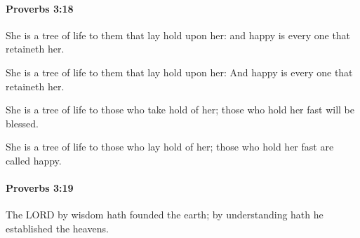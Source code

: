 		\paragraph{Proverbs 3:18} %
			\label{PROVERBS-3-18}

			She is a tree of life to them that lay hold upon her: and happy is every one that retaineth her.

			\begin{versebox}
					\item[BHS] 
					\item[ASV] She is a tree of life to them that lay hold upon her: And happy is every one that retaineth her.
					\item[NIV] She is a tree of life to those who take hold of her; those who hold her fast will be blessed.
					\item[NRSV] She is a tree of life to those who lay hold of her; those who hold her fast are called happy.
			\end{versebox}

		\paragraph{Proverbs 3:19} %
			\label{PROVERBS-3-19}

			The LORD by wisdom hath founded the earth; by understanding hath he established the heavens.

